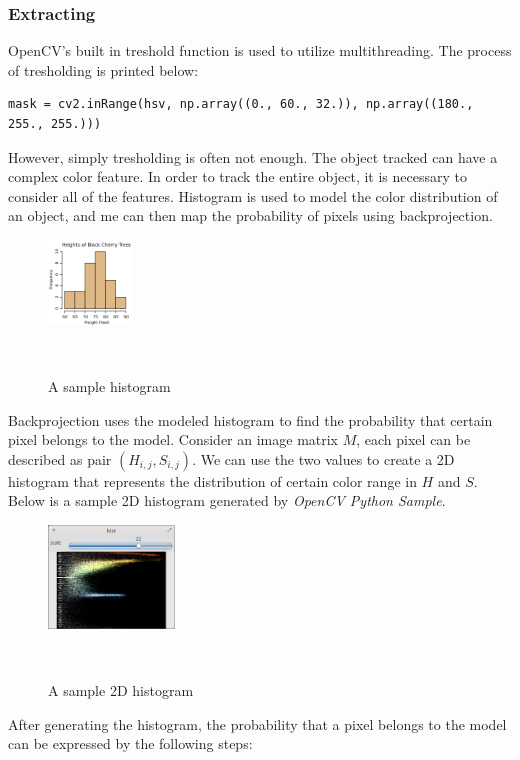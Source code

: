 \subsubsection{Extracting}
OpenCV's built in treshold function is used to utilize multithreading.
The process of tresholding is printed below:
\begin{lstlisting}
mask = cv2.inRange(hsv, np.array((0., 60., 32.)), np.array((180., 255., 255.)))
\end{lstlisting}
However, simply tresholding is often not enough. The object tracked can have a complex color feature. In order to track the entire object, it is necessary to consider all of the features. Histogram is used to model the color distribution of an object, and me can then map the probability of pixels using backprojection.\\
\begin{figure}[h!]
  
  \centering
    \includegraphics[width=0.2\textwidth]{./Pictures/histogram.JPG}
    \caption{A sample histogram\cite{cite5}}\\
\end{figure}
Backprojection uses the modeled histogram to find the probability that certain pixel belongs to the model. Consider an image matrix $M$, each pixel can be described as pair $(H_{i,j},S_{i,j})$. We can use the two values to create a 2D histogram that represents the distribution of certain color range in $H$ and $S$. Below is a sample 2D histogram generated by \emph{OpenCV Python Sample}.\\
\begin{figure}[h!]
  
  \centering
    \includegraphics[width=0.3\textwidth]{./Pictures/2dhist.png}
    \caption{A sample 2D histogram}\\
\end{figure}
After generating the histogram, the probability that a pixel belongs to the model can be expressed by the following steps:
